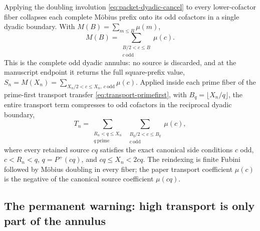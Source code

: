 \documentclass[11pt]{article}
\theoremstyle{definition}
\theoremstyle{remark}
\newcommand{\Pplus}{P^{+}}
\newcommand{\1}{\mathbf{1}}
\begin{document}
Applying the doubling involution \cref{eq:packet-dyadic-cancel} to every lower-cofactor fiber collapses each complete Möbius prefix onto its odd cofactors in a single dyadic boundary.  With $M(B)=\sum_{m\le B}\mu(m)$,
\begin{equation}
 \boxed{
 M(B)=\!\!\sum_{\substack{B/2<c\le B\\ c\ \mathrm{odd}}}\!\!\mu(c).
 }
 \label{eq:odd-annulus-identity}
\end{equation}
This is the complete odd dyadic annulus: no source is discarded, and at the manuscript endpoint it returns the full square-prefix value, $S_n=M(X_n)=\sum_{X_n/2<c\le X_n,\ c\ \mathrm{odd}}\mu(c)$.  Applied inside each prime fiber of the prime-first transport transfer \cref{eq:transport-primefirst}, with $B_q=\lfloor X_n/q\rfloor$, the entire transport term compresses to odd cofactors in the reciprocal dyadic boundary,
\begin{equation}
 \boxed{
 T_n=\!\!\sum_{\substack{R_n<q\le X_n\\ q\ \mathrm{prime}}}\
 \sum_{\substack{B_q/2<c\le B_q\\ c\ \mathrm{odd}}}\!\!\mu(c),
 }
 \label{eq:transport-dyadic}
\end{equation}
where every retained source $cq$ satisfies the exact canonical side conditions $c$ odd, $c<R_n<q$, $q=\Pplus(cq)$, and $cq\le X_n<2cq$.  The reindexing is finite Fubini followed by M\"obius doubling in every fiber; the paper transport coefficient $\mu(c)$ is the negative of the canonical source coefficient $\mu(cq)$.

\subsection{The permanent warning: high transport is only part of the annulus}
\end{document}
